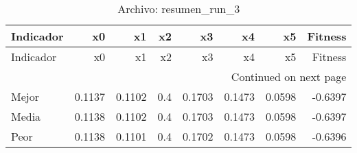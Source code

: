 \begin{longtable}{lrrrrrrr}
\caption{Archivo: resumen\_run\_3}\label{tab:resumen_run_3} \\
\toprule
Indicador & x0 & x1 & x2 & x3 & x4 & x5 & Fitness \\
\midrule
\endfirsthead
\toprule
Indicador & x0 & x1 & x2 & x3 & x4 & x5 & Fitness \\
\midrule
\endhead
\midrule
\multicolumn{8}{r}{Continued on next page} \\
\midrule
\endfoot
\bottomrule
\endlastfoot
Mejor & 0.1137 & 0.1102 & 0.4 & 0.1703 & 0.1473 & 0.0598 & -0.6397 \\
Media & 0.1138 & 0.1102 & 0.4 & 0.1703 & 0.1473 & 0.0598 & -0.6397 \\
Peor & 0.1138 & 0.1101 & 0.4 & 0.1702 & 0.1473 & 0.0598 & -0.6396 \\
\end{longtable}